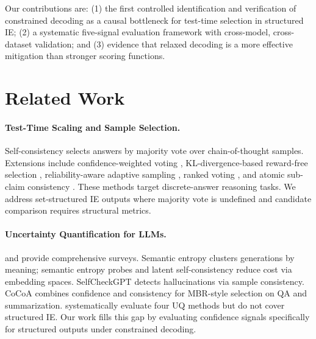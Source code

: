 \documentclass[11pt,a4paper]{article}
\begin{document}
Our contributions are: (1) the first controlled identification and verification of constrained decoding as a causal bottleneck for test-time selection in structured IE; (2) a systematic five-signal evaluation framework with cross-model, cross-dataset validation; and (3) evidence that relaxed decoding is a more effective mitigation than stronger scoring functions.

\section{Related Work}
\label{sec:related}

\paragraph{Test-Time Scaling and Sample Selection.}
Self-consistency \citep{wang2023selfconsistency} selects answers by majority vote over chain-of-thought samples. Extensions include confidence-weighted voting \citep[CISC;][]{cisc2025}, KL-divergence-based reward-free selection \citep[Self-Certainty;][]{selfcertainty2026}, reliability-aware adaptive sampling \citep[ReASC;][]{reasc2026}, ranked voting \citep{rankedvoting2025}, and atomic sub-claim consistency \citep{atomicsc2024}. These methods target discrete-answer reasoning tasks. We address set-structured IE outputs where majority vote is undefined and candidate comparison requires structural metrics.

\paragraph{Uncertainty Quantification for LLMs.}
\citet{uqsurvey2025} and \citet{uqcalibsurvey2025} provide comprehensive surveys. Semantic entropy \citep{kuhn2023semantic} clusters generations by meaning; semantic entropy probes \citep{seprobes2024} and latent self-consistency \citep{latentsc2025} reduce cost via embedding spaces. SelfCheckGPT \citep{manakul2023selfcheckgpt} detects hallucinations via sample consistency. CoCoA \citep{cocoa2025} combines confidence and consistency for MBR-style selection on QA and summarization. \citet{vashurin2025systematic} systematically evaluate four UQ methods but do not cover structured IE. Our work fills this gap by evaluating confidence signals specifically for structured outputs under constrained decoding.
\end{document}

